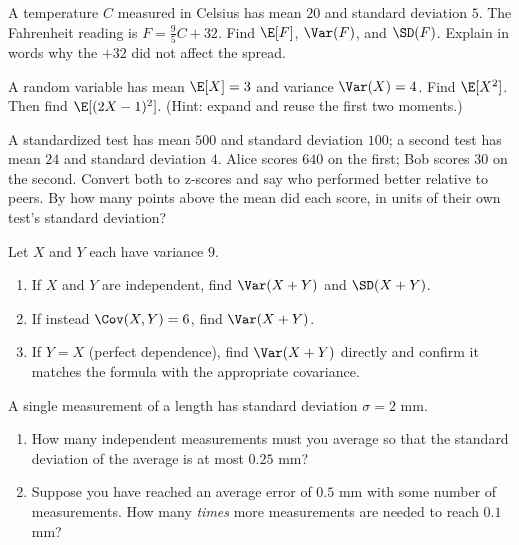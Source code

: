 \begin{exercise}
\label{ch09:exr-affine}
A temperature $C$ measured in Celsius has mean $20$ and standard deviation
$5$. The Fahrenheit reading is $F = \tfrac{9}{5}C + 32$. Find $\E[F]$,
$\Var(F)$, and $\SD(F)$. Explain in words why the $+32$ did not affect the
spread.
\end{exercise}

\begin{exercise}
\label{ch09:exr-reverse}
A random variable has mean $\E[X] = 3$ and variance $\Var(X) = 4$. Find
$\E[X^2]$. Then find $\E[(2X-1)^2]$. (Hint: expand and reuse the first two
moments.)
\end{exercise}

\begin{exercise}
\label{ch09:exr-zscore}
A standardized test has mean $500$ and standard deviation $100$; a second test
has mean $24$ and standard deviation $4$. Alice scores $640$ on the first;
Bob scores $30$ on the second. Convert both to z-scores and say who performed
better relative to peers. By how many points above the mean did each score,
in units of their own test's standard deviation?
\end{exercise}

\begin{exercise}
\label{ch09:exr-sum}
Let $X$ and $Y$ each have variance $9$.
\begin{enumerate}
  \item If $X$ and $Y$ are independent, find $\Var(X+Y)$ and $\SD(X+Y)$.
  \item If instead $\Cov(X,Y) = 6$, find $\Var(X+Y)$.
  \item If $Y = X$ (perfect dependence), find $\Var(X+Y)$ directly and
        confirm it matches the formula with the appropriate covariance.
\end{enumerate}
\end{exercise}

\begin{exercise}
\label{ch09:exr-sqrtn}
A single measurement of a length has standard deviation $\sigma = 2$ mm.
\begin{enumerate}
  \item How many independent measurements must you average so that the
        standard deviation of the average is at most $0.25$ mm?
  \item Suppose you have reached an average error of $0.5$ mm with some number
        of measurements. How many \emph{times} more measurements are needed to
        reach $0.1$ mm?
\end{enumerate}
\end{exercise}

